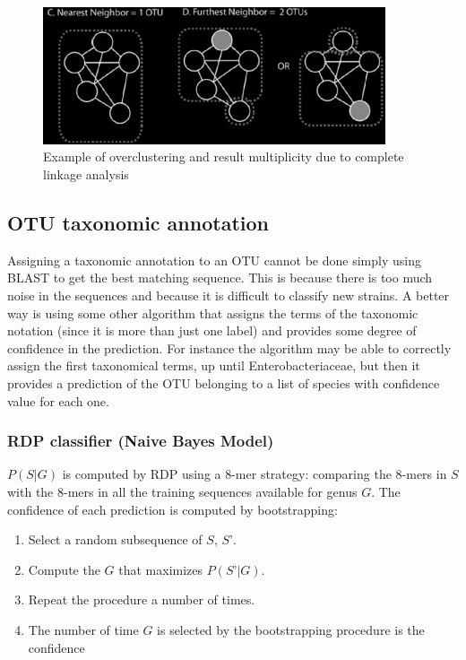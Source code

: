     \begin{figure}[!h]
      \centering
      \includegraphics[width=0.9\textwidth]{overclustering.png}
      \caption{\label{fig:overclustering}Example of overclustering and result multiplicity due to complete linkage analysis}
    \end{figure}

  \subsection{OTU taxonomic annotation}
  Assigning a taxonomic annotation to an OTU cannot be done simply using BLAST to get the best matching sequence.
  This is because there is too much noise in the sequences and because it is difficult to classify new strains.
  A better way is using some other algorithm that assigns the terms of the taxonomic notation (since it is more than just one label) and provides some degree of confidence in the prediction.
  For instance the algorithm may be able to correctly assign the first taxonomical terms, up until Enterobacteriaceae, but then it provides a prediction of the OTU belonging to a list of species with confidence value for each one.

    \subsubsection{RDP classifier (Naive Bayes Model)}
    $P(S|G)$ is computed by RDP using a 8-mer strategy: comparing the 8-mers in $S$ with the 8-mers in all the training sequences available for genus $G$.
    The confidence of each prediction is computed by bootstrapping:

    \begin{multicols}{2}
      \begin{enumerate}
          \item Select a random subsequence of $S$, $S’$.
          \item Compute the $G$ that maximizes $P(S’|G)$.
          \item Repeat the procedure a number of times.
          \item The number of time $G$ is selected by the bootstrapping procedure is the confidence
      \end{enumerate}
    \end{multicols}

